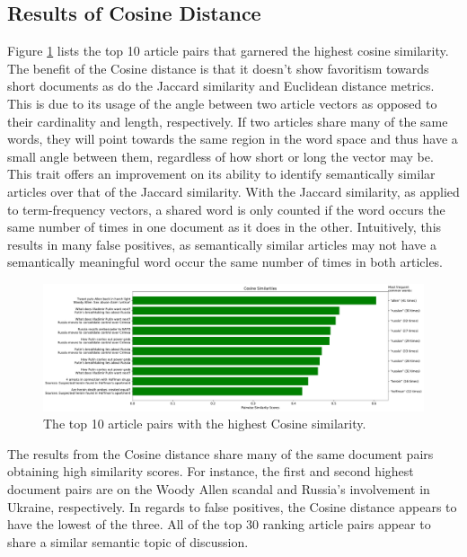 \documentclass[11pt]{article}
\begin{document}
\subsection{Results of Cosine Distance}

Figure \ref{fig:cosine} lists the top 10 article pairs that garnered the highest cosine similarity.
The benefit of the Cosine distance is that it doesn't show favoritism towards short documents as do the Jaccard similarity and Euclidean distance metrics.
This is due to its usage of the angle between two article vectors as opposed to their cardinality and length, respectively.
If two articles share many of the same words, they will point towards the same region in the word space and thus have a small angle between them, regardless of how short or long the vector may be.
This trait offers an improvement on its ability to identify semantically similar articles over that of the Jaccard similarity.
With the Jaccard similarity, as applied to term-frequency vectors, a shared word is only counted if the word occurs the same number of times in one document as it does in the other.
Intuitively, this results in many false positives, as semantically similar articles may not have a semantically meaningful word occur the same number of times in both articles.

\begin{figure}[h] \label{fig:cosine}
  \centering
  \includegraphics[width=\textwidth]{figures/cosine_most_sim}
  \caption{The top 10 article pairs with the highest Cosine similarity.}
\end{figure}

The results from the Cosine distance share many of the same document pairs obtaining high similarity scores. For instance, the first and second highest document pairs are on the Woody Allen scandal and Russia's involvement in Ukraine, respectively.
In regards to false positives, the Cosine distance appears to have the lowest of the three.
All of the top 30 ranking article pairs appear to share a similar semantic topic of discussion.
\end{document}
